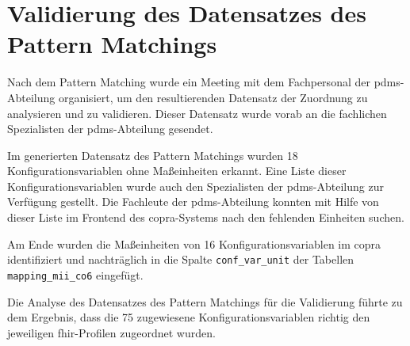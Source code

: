 \section{Validierung des Datensatzes des Pattern Matchings } \label{sec:validmethode}

Nach dem Pattern Matching wurde ein Meeting mit dem Fachpersonal der \ac{pdms}-Abteilung organisiert, um den resultierenden Datensatz der Zuordnung zu analysieren und zu validieren. Dieser Datensatz wurde vorab an die fachlichen Spezialisten der \ac{pdms}-Abteilung gesendet.

Im generierten Datensatz des Pattern Matchings wurden 18 Konfigurationsvariablen ohne Maßeinheiten erkannt. Eine Liste dieser Konfigurationsvariablen wurde auch den Spezialisten der \ac{pdms}-Abteilung zur Verfügung gestellt. Die Fachleute der \ac{pdms}-Abteilung konnten mit Hilfe von dieser Liste im Frontend des \ac{copra}-Systems nach den fehlenden Einheiten suchen.

Am Ende wurden die Maßeinheiten von 16 Konfigurationsvariablen im \ac{copra} identifiziert und nachträglich in die Spalte \texttt{conf\_var\_unit} der Tabellen \texttt{mapping\_mii\_co6} eingefügt.

Die Analyse des Datensatzes des Pattern Matchings für die Validierung führte zu dem Ergebnis, dass die 75 zugewiesene Konfigurationsvariablen richtig den jeweiligen \ac{fhir}-Profilen zugeordnet wurden.